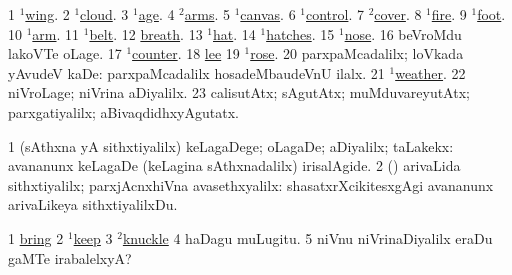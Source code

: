 \noindent
\gl{\pagu}
\expl{}
\bmng
{} 
\bnum
\num{1}  \hyperref{kandict_w.pdf}{W}{wing(1) pagu(8)}{$^1$wing}. 
\num{2}  \hyperref{kandict_c.pdf}{C}{cloud(1) nuga(2)}{$^1$cloud}. 
\num{3}  \hyperref{kandict_a.pdf}{A}{age(1) pagu(5)}{$^1$age}. 
\num{4}  \hyperref{kandict_a.pdf}{A}{arm(2) nuga(4)}{$^2$arms}. 
\num{5}  \hyperref{kandict_c.pdf}{C}{convas(1) pagu(1)}{$^1$canvas}. 
\num{6}  \hyperref{kandict_c.pdf}{C}{control(1) pagu(3)}{$^1$control}. 
\num{7} \hyperref{kandict_c.pdf}{C}{cover(2) pagu(3)}{$^2$cover}. 
\num{8}  \hyperref{kandict_f.pdf}{F}{fire(1) pagu(9)}{$^1$fire}. 
\num{9}  \hyperref{kandict_f.pdf}{F}{foot(1) nuga(37)}{$^1$foot}. 
\num{10}  \hyperref{kandict_a.pdf}{A}{arm(1) pagu(2)}{$^1$arm}. 
\num{11}  \hyperref{kandict_b.pdf}{B}{belt(1) nuga(4)}{$^1$belt}. 
\num{12}  \hyperref{kandict_b.pdf}{B}{breathpagu(13)}{breath}. 
\num{13}  \hyperref{kandict_h.pdf}{H}{hat(1) nuga(15)}{$^1$hat}. 
\num{14}  \hyperref{kandict_h.pdf}{H}{hatch(1) pagu(2)}{$^1$hatches}. 
\num{15} \hyperref{kandict_n.pdf}{N}{nose(1) pagu(29)}{$^1$nose}. 
\num{16}  beVroMdu lakoVTe oLage. 
\num{17} \hyperref{kandict_c.pdf}{C}{counter(1) nuga(2)}{$^1$counter}. 
\num{18}  \hyperref{kandict_l.pdf}{L}{lee pagu}{lee}  
\num{19} \hyperref{kandict_r.pdf}{R}{rose(1) pagu(13)}{$^1$rose}. 
\num{20}  parxpaMcadalilx; loVkada yAvudeV kaDe:  parxpaMcadalilx hosadeMbaudeVnU ilalx. 
\num{21}  \hyperref{kandict_w.pdf}{W}{weather(1) pagu(7)}{$^1$weather}. 
\num{22}  niVroLage; niVrina aDiyalilx. 
\num{23}  calisutAtx; sAgutAtx; muMduvareyutAtx; parxgatiyalilx; aBivaqdidhxyAgutatx. 
\enum
\emng
\eentry

\bentry
{} 
\gl{\kirxvi}
\expl{}
\bmng
\bnum
\num{1} (sAthxna yA sithxtiyalilx) keLagaDege; oLagaDe; aDiyalilx; taLakekx:  avananunx keLagaDe (keLagina sAthxnadalilx) irisalAgide. 
\num{2} (\AmA) arivaLida sithxtiyalilx; parxjAcnxhiVna avasethxyalilx:  shasatxrXcikitesxgAgi avananunx arivaLikeya sithxtiyalilxDu. 
\enum
\emng

\noindent
\gl{\pagu}
\expl{}
\bmng
\bnum
\num{1} \hyperref{kandict_b.pdf}{B}{bring nuga(26)}{bring}  
\num{2} \hyperref{kandict_k.pdf}{K}{keep(1) nuga(37)}{$^1$keep}  
\num{3} \hyperref{kandict_k.pdf}{K}{knuckle(2) pagu(1)}{$^2$knuckle}  
\num{4}  haDagu muLugitu. 
\num{5}  niVnu niVrinaDiyalilx eraDu gaMTe irabalelxyA? 
\enum
\emng
\eentry

